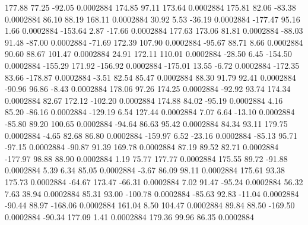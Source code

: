       177.88       77.25      -92.05     0.0002884
      174.85       97.11      173.64     0.0002884
      175.81       82.06      -83.38     0.0002884
       86.10       88.19      168.11     0.0002884
       30.92        5.53      -36.19     0.0002884
     -177.47       95.16        1.66     0.0002884
     -153.64        2.87      -17.66     0.0002884
      177.63      173.06       81.81     0.0002884
      -88.03       91.48      -87.00     0.0002884
      -71.69      172.39      107.90     0.0002884
      -95.67       88.71        8.66     0.0002884
       90.60       88.67      101.47     0.0002884
       24.91      172.11      110.01     0.0002884
      -28.50        6.45     -154.50     0.0002884
     -155.29      171.92     -156.92     0.0002884
     -175.01       13.55       -6.72     0.0002884
     -172.35       83.66     -178.87     0.0002884
       -3.51       82.54       85.47     0.0002884
       88.30       91.79       92.41     0.0002884
      -90.96       96.86       -8.43     0.0002884
      178.06       97.26      174.25     0.0002884
      -92.92       93.74      174.34     0.0002884
       82.67      172.12     -102.20     0.0002884
      174.88       84.02      -95.19     0.0002884
        4.16       85.20      -86.16     0.0002884
     -129.19        6.54      127.44     0.0002884
        7.07        6.64      -13.10     0.0002884
      -85.80       89.20      100.65     0.0002884
      -94.64       86.63       95.42     0.0002884
       84.34       93.11      179.75     0.0002884
       -4.65       82.68       86.80     0.0002884
     -159.97        6.52      -23.16     0.0002884
      -85.13       95.71      -97.15     0.0002884
      -90.87       91.39      169.78     0.0002884
       87.19       89.52       82.71     0.0002884
     -177.97       98.88       88.90     0.0002884
        1.19       75.77      177.77     0.0002884
      175.55       89.72      -91.88     0.0002884
        5.39        6.34       85.05     0.0002884
       -3.67       86.09       98.11     0.0002884
      175.61       93.38      175.73     0.0002884
      -64.67      173.47      -66.31     0.0002884
        7.02       91.47      -95.24     0.0002884
       56.32        7.63       38.94     0.0002884
       85.31       93.00     -100.78     0.0002884
      -85.63       92.83      -11.04     0.0002884
      -90.44       88.97     -168.06     0.0002884
      161.04        8.50      104.47     0.0002884
       89.84       88.50     -169.50     0.0002884
      -90.34      177.09        1.41     0.0002884
      179.36       99.96       86.35     0.0002884
